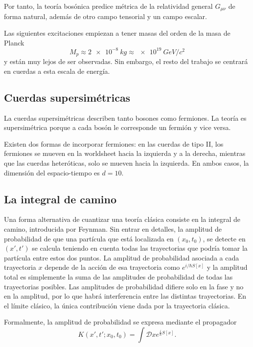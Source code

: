 Por tanto, la teoría bosónica predice métrica de la relatividad general $G_{\mu\nu}$ de forma 
natural, además de otro campo tensorial y un campo escalar.

Las siguientes excitaciones empiezan a tener masas del orden de la masa de Planck
\begin{equation}
  M_p\approx\SI{2e-8}{kg} \approx \SI{e19}{GeV/c^2}
\end{equation}
y están muy lejos de ser observadas. Sin embargo, el resto del trabajo se centrará en cuerdas
a esta escala de energía.


\subsection{Cuerdas supersimétricas}

La cuerdas supersimétricas describen tanto bosones como fermiones.
La teoría es supersimétrica porque a cada bosón le corresponde un fermión y vice versa.

Existen dos formas de incorporar fermiones:
en las cuerdas de tipo II, los fermiones se mueven en la worldsheet hacia la izquierda y a la derecha,
mientras que las cuerdas heteróticas, solo se mueven hacia la izquierda.
En ambos casos, la dimensión del espacio-tiempo es $d=10$.


\subsection{La integral de camino}

Una forma alternativa de cuantizar una teoría clásica consiste en la integral de camino, 
introducida por Feynman. 
Sin entrar en detalles, la amplitud de probabilidad de que una partícula que está localizada 
en $(x_0,t_0)$, se detecte en $(x',t')$ se calcula teniendo en cuenta todas las trayectorias
que podría tomar la partícula entre estos dos puntos.
La amplitud de probabilidad asociada a cada trayectoria $x$ depende de la acción de esa trayectoria
como $e^{i/\hbar S[x]}$ y la amplitud total es simplemente la suma de las amplitudes de probabilidad
de todas las trayectorias posibles.
Las amplitudes de probabilidad difiere solo en la fase y no en la amplitud, por lo que habrá 
interferencia entre las distintas trayectorias.
En el límite clásico, la única contribución viene dada por la trayectoria clásica.

Formalmente, la amplitud de probabilidad se expresa mediante el propagador
\begin{equation}
  K(x',t';x_0,t_0) = \int \mathcal Dx e^{\frac{i}{\hbar} S[x]}.
\end{equation}

